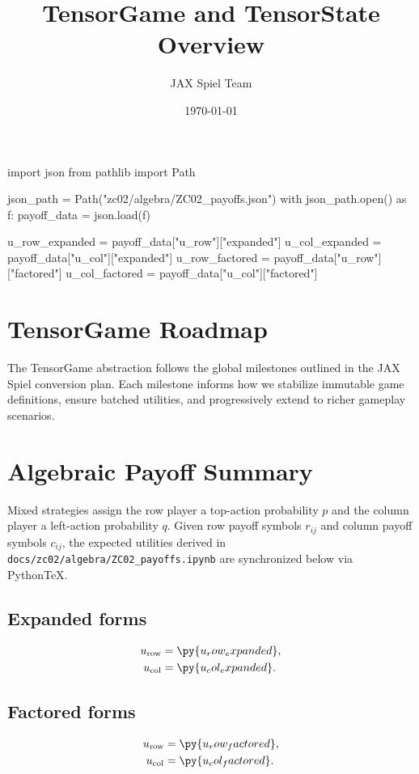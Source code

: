 \documentclass{article}
\title{TensorGame and TensorState Overview}
\author{JAX Spiel Team}
\date{\today}
\begin{document}
\maketitle

\begin{pycode}
import json
from pathlib import Path

json_path = Path("zc02/algebra/ZC02_payoffs.json")
with json_path.open() as f:
    payoff_data = json.load(f)

u_row_expanded = payoff_data["u_row"]["expanded"]
u_col_expanded = payoff_data["u_col"]["expanded"]
u_row_factored = payoff_data["u_row"]["factored"]
u_col_factored = payoff_data["u_col"]["factored"]
\end{pycode}

\section{TensorGame Roadmap}
The TensorGame abstraction follows the global milestones outlined in the JAX Spiel conversion plan. Each milestone informs how we
stabilize immutable game definitions, ensure batched utilities, and progressively extend to richer gameplay scenarios.


\section{Algebraic Payoff Summary}
Mixed strategies assign the row player a top-action probability $p$ and the column player a left-action probability $q$. Given row
payoff symbols $r_{ij}$ and column payoff symbols $c_{ij}$, the expected utilities derived in
\texttt{docs/zc02/algebra/ZC02\_payoffs.ipynb} are synchronized below via PythonTeX.

\subsection{Expanded forms}
\begin{align*}
u_{\text{row}} &= \py{u_row_expanded},\\
u_{\text{col}} &= \py{u_col_expanded}.
\end{align*}

\subsection{Factored forms}
\begin{align*}
u_{\text{row}} &= \py{u_row_factored},\\
u_{\text{col}} &= \py{u_col_factored}.
\end{align*}
\end{document}
